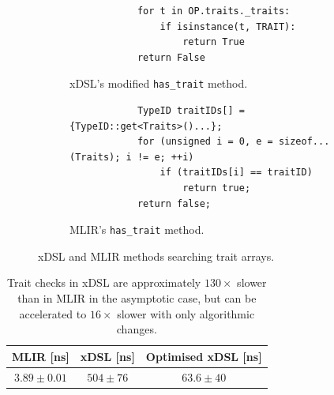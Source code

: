 \begin{figure}[H]
    \centering
    \begin{subfigure}[b]{0.45\textwidth}
       \centering
        \begin{verbatim}
            for t in OP.traits._traits:
                if isinstance(t, TRAIT):
                    return True
            return False
        \end{verbatim}
        \footnotesize\vspace{2em}
        \captionsetup{name=Listing}
        \caption{xDSL's modified \texttt{has_trait} method.}
        \label{listing:ubenchmark-trait-checks-both-xdsl}
    \end{subfigure}
    \hfill
    \begin{subfigure}[b]{0.45\textwidth}
        \centering
        \begin{verbatim}
            TypeID traitIDs[] = {TypeID::get<Traits>()...};
            for (unsigned i = 0, e = sizeof...(Traits); i != e; ++i)
                if (traitIDs[i] == traitID)
                    return true;
            return false;
        \end{verbatim}
        \captionsetup{name=Listing}
        \caption{MLIR's \texttt{has_trait} method.}
        \label{listing:ubenchmark-trait-checks-both-mlir}
    \end{subfigure}
    \vspace{1em}
    \captionsetup{name=Listing}
    \caption{xDSL and MLIR methods searching trait arrays.}
    \label{listing:ubenchmark-trait-checks-both}
\end{figure}



\begin{table}[H]
  \caption{Trait checks in xDSL are approximately $130\times$ slower than in MLIR in the asymptotic case, but can be accelerated to $16\times$ slower with only algorithmic changes.} %
  \label{tab:ubenchmark-trait-checks-optimised}
  \centering
  \begin{tabular}{ccc}
    \toprule
    \textbf{MLIR [ns]} & \textbf{xDSL [ns]} & \textbf{Optimised xDSL [ns]} \\
    \midrule
    $3.89 \pm 0.01$ & $504 \pm 76$ & $63.6 \pm 40$\\
    \bottomrule
  \end{tabular}
\end{table}


